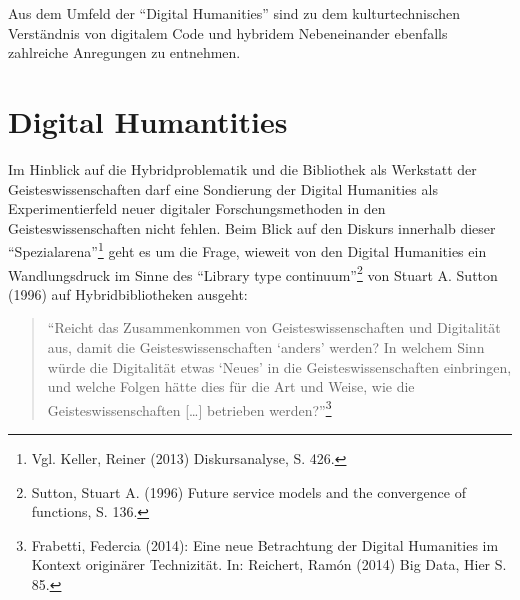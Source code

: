 \documentclass[a4paper,
fontsize=11pt,
oneside,
numbers=noperiodatend,
parskip=half-,
bibliography=totoc,
final
]{scrartcl}
\begin{document}
Aus dem Umfeld der \enquote{Digital Humanities} sind zu dem
kulturtechnischen Verständnis von digitalem Code und hybridem
Nebeneinander ebenfalls zahlreiche Anregungen zu entnehmen.

\section*{Digital Humantities}\label{digital-humantities}

Im Hinblick auf die Hybridproblematik und die Bibliothek als Werkstatt
der Geisteswissenschaften darf eine Sondierung der Digital Humanities
als Experimentierfeld neuer digitaler Forschungsmethoden in den
Geisteswissenschaften nicht fehlen. Beim Blick auf den Diskurs innerhalb
dieser \enquote{Spezialarena}\footnote{Vgl. Keller, Reiner (2013)
  Diskursanalyse, S. 426.} geht es um die Frage, wieweit von den Digital
Humanities ein Wandlungsdruck im Sinne des \enquote{Library type
continuum}\footnote{Sutton, Stuart A. (1996) Future service models and
  the convergence of functions, S. 136.} von Stuart A. Sutton (1996) auf
Hybridbibliotheken ausgeht:

\begin{quote}
\enquote{Reicht das Zusammenkommen von Geisteswissenschaften und
Digitalität aus, damit die Geisteswissenschaften \enquote{anders}
werden? In welchem Sinn würde die Digitalität etwas \enquote{Neues} in
die Geisteswissenschaften einbringen, und welche Folgen hätte dies für
die Art und Weise, wie die Geisteswissenschaften {[}\ldots{}{]}
betrieben werden?}\footnote{Frabetti, Federcia (2014): Eine neue
  Betrachtung der Digital Humanities im Kontext originärer Technizität.
  In: Reichert, Ramón (2014) Big Data, Hier S. 85.}
\end{quote}
\end{document}
